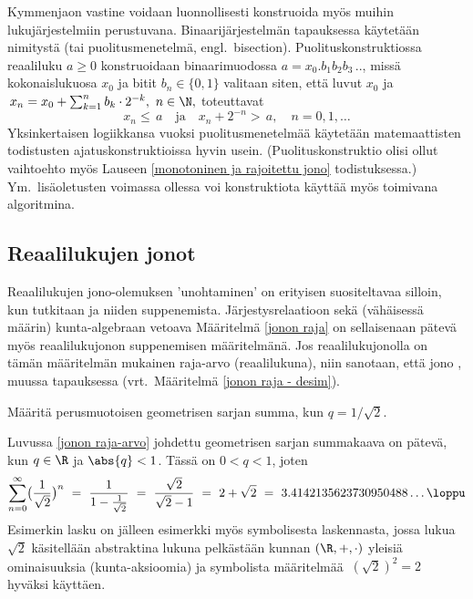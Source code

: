 Kymmenjaon vastine voidaan luonnollisesti konstruoida myös muihin lukujärjestelmiin perustuvana. 
Binaarijärjestelmän tapauksessa käytetään nimitystä  (tai 
puolitusmenetelmä, engl.\ bisection). Puolituskonstruktiossa reaaliluku $a \ge 0$ konstruoidaan
binaarimuodossa $a = x_0.b_1b_2b_3\,..$, missä kokonaislukuosa $x_0$ ja bitit $b_n \in \{0,1\}$
valitaan siten, että luvut $x_0$ ja $\,x_n = x_0 + \sum_{k=1}^n b_k \cdot 2^{-k},\ n \in \N,$
toteuttavat  
\[
x_n \le\,a \quad \text{ja} \quad x_n + 2^{-n} >\,a, \quad n = 0,1, \ldots
\]
Yksinkertaisen logiikkansa vuoksi puolitusmenetelmää käytetään matemaattisten todistusten 
ajatuskonstruktioissa hyvin usein. (Puolituskonstruktio olisi ollut vaihtoehto myös Lauseen
\ref{monotoninen ja rajoitettu jono} todistuksessa.) Ym.\ lisäoletusten voimassa ollessa voi
konstruktiota käyttää myös toimivana algoritmina.

\subsection*{Reaalilukujen jonot}

Reaalilukujen jono-olemuksen 'unohtaminen' on erityisen suositeltavaa silloin, kun tutkitaan 
 ja niiden suppenemista. Järjestysrelaatioon sekä (vähäisessä määrin)
kunta-algebraan vetoava Määritelmä \ref{jonon raja} on sellaisenaan pätevä myös reaalilukujonon
suppenemisen määritelmänä. Jos reaalilukujonolla on tämän määritelmän mukainen raja-arvo
(reaalilukuna), niin sanotaan, että jono
, muussa tapauksessa  (vrt.\ Määritelmä \ref{jonon raja - desim}). 
\begin{Exa} \label{reaalinen geometrinen sarja} Määritä perusmuotoisen geometrisen sarjan summa,
kun $q = 1/\sqrt{2}$. 
\end{Exa}
\ratk Luvussa \ref{jonon raja-arvo} johdettu geometrisen sarjan summakaava on pätevä, kun 
$q \in \R$ ja $\abs{q}<1$. Tässä on $0<q<1$, joten
\[
\sum_{n=0}^{\infty} \bigl( \frac{1}{\sqrt{2}} \bigr)^n\ 
                      =\ \frac{1}{1-\frac{1}{\sqrt{2}}}\ =\ \frac{\sqrt{2}}{\sqrt{2}-1}\ 
                      =\ 2 + \sqrt{2}\ =\ 3.4142135623730950488 \ldots  \loppu
\]
Esimerkin lasku on jälleen esimerkki myös symbolisesta laskennasta, jossa lukua $\sqrt{2}$ 
käsitellään abstraktina lukuna pelkästään kunnan $(\R,+,\cdot)$ yleisiä ominaisuuksia 
(kunta-aksioomia) ja symbolista määritelmää $\ (\sqrt{2})^2 = 2\ $ hyväksi käyttäen.

